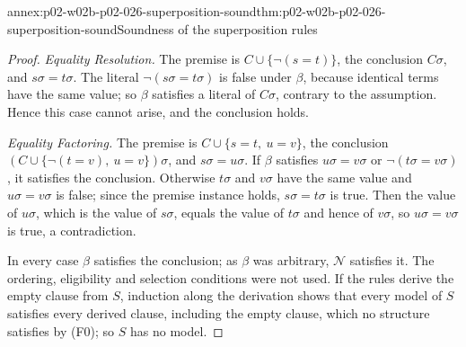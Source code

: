\begin{annexitem}{annex:p02-w02b-p02-026-superposition-sound}{thm:p02-w02b-p02-026-superposition-sound}{Soundness of the superposition rules}
\begin{proof}
\emph{Equality Resolution.}  The premise is \(C\cup\{\neg(s=t)\}\), the
conclusion \(C\sigma\), and \(s\sigma=t\sigma\).  The literal
\(\neg(s\sigma=t\sigma)\) is false under \(\beta\), because identical terms
have the same value; so \(\beta\) satisfies a literal of \(C\sigma\), contrary
to the assumption.  Hence this case cannot arise, and the conclusion holds.

\emph{Equality Factoring.}  The premise is \(C\cup\{s=t,\ u=v\}\), the
conclusion \((C\cup\{\neg(t=v),\ u=v\})\sigma\), and \(s\sigma=u\sigma\).  If
\(\beta\) satisfies \(u\sigma=v\sigma\) or \(\neg(t\sigma=v\sigma)\), it
satisfies the conclusion.  Otherwise \(t\sigma\) and \(v\sigma\) have the same
value and \(u\sigma=v\sigma\) is false; since the premise instance holds,
\(s\sigma=t\sigma\) is true.  Then the value of \(u\sigma\), which is the
value of \(s\sigma\), equals the value of \(t\sigma\) and hence of
\(v\sigma\), so \(u\sigma=v\sigma\) is true, a contradiction.

In every case \(\beta\) satisfies the conclusion; as \(\beta\) was arbitrary,
\(\mathcal N\) satisfies it.  The ordering, eligibility and selection
conditions were not used.  If the rules derive the empty clause from \(S\),
induction along the derivation shows that every model of \(S\) satisfies
every derived clause, including the empty clause, which no structure
satisfies by (F0); so \(S\) has no model.
\end{proof}
\end{annexitem}
